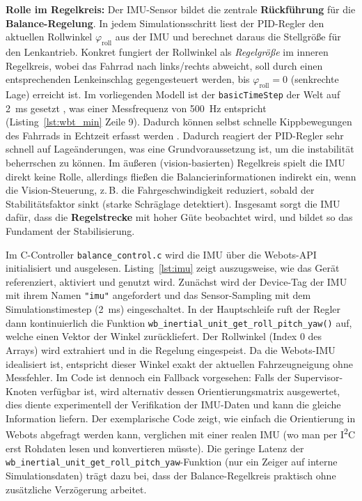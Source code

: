   \textbf{Rolle im Regelkreis:} Der IMU-Sensor bildet die zentrale \textbf{Rückführung} für die 
  \textbf{Balance-Regelung}. In jedem Simulationsschritt liest der PID-Regler 
  den aktuellen Rollwinkel $\varphi_{\text{roll}}$ aus der IMU und berechnet daraus 
  die Stellgröße für den Lenkantrieb. Konkret fungiert der Rollwinkel als 
  \emph{Regelgröße} im inneren Regelkreis,  wobei das Fahrrad nach links/rechts abweicht, 
  soll durch einen entsprechenden Lenkeinschlag gegengesteuert werden, 
  bis $\varphi_{\text{roll}} = 0$ (senkrechte Lage) erreicht ist.  Im vorliegenden Modell ist der \texttt{basicTimeStep} 
  der Welt auf 2~ms gesetzt \citep{githubWebots}, was einer Messfrequenz von 500~Hz entspricht (Listing~\ref{lst:wbt_min} Zeile 9). Dadurch  können selbst schnelle Kippbewegungen des Fahrrads in Echtzeit erfasst werden \citep{githubWebots}.
  Dadurch reagiert der PID-Regler sehr schnell auf Lageänderungen, was eine Grundvoraussetzung ist, 
  um die instabilität beherrschen zu können. Im äußeren (vision-basierten) 
  Regelkreis spielt die IMU direkt keine Rolle, allerdings fließen die Balancierinformationen indirekt ein, wenn die Vision-Steuerung, 
  z.\,B. die Fahrgeschwindigkeit reduziert, sobald der Stabilitätsfaktor sinkt (starke Schräglage detektiert). 
  Insgesamt sorgt die IMU dafür, dass die \textbf{Regelstrecke} mit hoher Güte beobachtet wird, und bildet so das Fundament der Stabilisierung.


  Im C-Controller \texttt{balance\_control.c} wird die IMU über die Webots-API 
  initialisiert und ausgelesen. Listing~\ref{lst:imu} zeigt auszugsweise, wie das Gerät referenziert, 
  aktiviert und genutzt wird. Zunächst wird der Device-Tag der IMU mit ihrem Namen 
  \texttt{"imu"} angefordert und das Sensor-Sampling mit dem Simulationstimestep 
  (2~ms) eingeschaltet. In der Hauptschleife ruft der Regler dann kontinuierlich die Funktion 
  \texttt{wb\_inertial\_unit\_get\_roll\_pitch\_yaw()} auf, welche einen Vektor der Winkel zurückliefert. 
  Der Rollwinkel (Index 0 des Arrays) wird extrahiert und in die Regelung eingespeist. 
  Da die Webots-IMU idealisiert ist, entspricht dieser Winkel exakt der aktuellen 
  Fahrzeugneigung ohne Messfehler. Im Code ist dennoch ein Fallback vorgesehen: Falls der Supervisor-Knoten verfügbar ist, 
  wird alternativ dessen Orientierungs\-matrix ausgewertet, dies diente experimentell 
  der Verifikation der IMU-Daten und kann die gleiche Information liefern. 
  Der exemplarische Code zeigt, wie einfach die Orientierung in Webots abgefragt werden kann, 
  verglichen mit einer realen IMU (wo man per I\textsuperscript{2}C erst Rohdaten lesen und konvertieren müsste). 
  Die geringe Latenz der \texttt{wb\_inertial\_unit\_get\_roll\_pitch\_yaw}-Funktion 
  (nur ein Zeiger auf interne Simulationsdaten) trägt dazu bei, dass der Balance-Regelkreis 
  praktisch ohne zusätzliche Verzögerung arbeitet.

